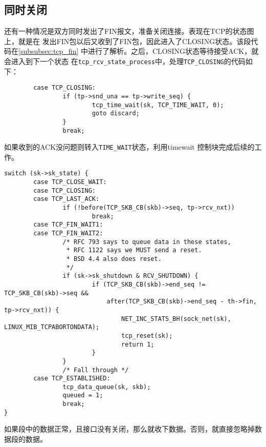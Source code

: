 \subsection{同时关闭}
\label{subsec:fin_at_same_time}
还有一种情况是双方同时发出了FIN报文，准备关闭连接。表现在TCP的状态图上，就是在
发出FIN包以后又收到了FIN包，因此进入了CLOSING状态。该段代码在\ref{subsubsec:tcp_fin}
中进行了解析。之后，CLOSING状态等待接受ACK，就会进入到下一个状态
在\texttt{tcp_rcv_state_process}中，处理\texttt{TCP_CLOSING}的代码如下：
\begin{verbatim}
        case TCP_CLOSING:
                if (tp->snd_una == tp->write_seq) {
                        tcp_time_wait(sk, TCP_TIME_WAIT, 0);
                        goto discard;
                }
                break;
\end{verbatim}
如果收到的ACK没问题则转入\texttt{TIME_WAIT}状态，利用timewait
控制块完成后续的工作。
\begin{verbatim}
switch (sk->sk_state) {
        case TCP_CLOSE_WAIT:
        case TCP_CLOSING:
        case TCP_LAST_ACK:
                if (!before(TCP_SKB_CB(skb)->seq, tp->rcv_nxt))
                        break;
        case TCP_FIN_WAIT1:
        case TCP_FIN_WAIT2:
                /* RFC 793 says to queue data in these states,
                 * RFC 1122 says we MUST send a reset.
                 * BSD 4.4 also does reset.
                 */
                if (sk->sk_shutdown & RCV_SHUTDOWN) {
                        if (TCP_SKB_CB(skb)->end_seq != TCP_SKB_CB(skb)->seq &&
                            after(TCP_SKB_CB(skb)->end_seq - th->fin, tp->rcv_nxt)) {
                                NET_INC_STATS_BH(sock_net(sk), LINUX_MIB_TCPABORTONDATA);
                                tcp_reset(sk);
                                return 1;
                        }
                }
                /* Fall through */
        case TCP_ESTABLISHED:
                tcp_data_queue(sk, skb);
                queued = 1;
                break;
}
\end{verbatim}
如果段中的数据正常，且接口没有关闭，那么就收下数据。否则，就直接忽略掉数据段的数据。

